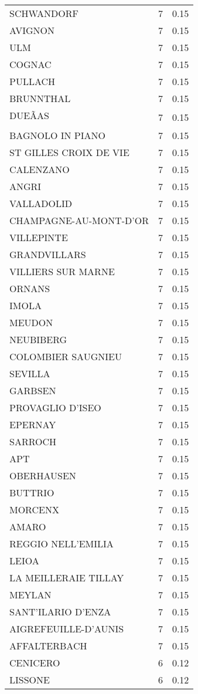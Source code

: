 \begin{table*}[htbp]
\begin{tabular}{lrr}
SCHWANDORF & 7 & 0.15 \\
AVIGNON & 7 & 0.15 \\
ULM & 7 & 0.15 \\
COGNAC & 7 & 0.15 \\
PULLACH & 7 & 0.15 \\
BRUNNTHAL & 7 & 0.15 \\
DUEÃAS & 7 & 0.15 \\
BAGNOLO IN PIANO & 7 & 0.15 \\
ST GILLES CROIX DE VIE & 7 & 0.15 \\
CALENZANO & 7 & 0.15 \\
ANGRI & 7 & 0.15 \\
VALLADOLID & 7 & 0.15 \\
CHAMPAGNE-AU-MONT-D'OR & 7 & 0.15 \\
VILLEPINTE & 7 & 0.15 \\
GRANDVILLARS & 7 & 0.15 \\
VILLIERS SUR MARNE & 7 & 0.15 \\
ORNANS & 7 & 0.15 \\
IMOLA & 7 & 0.15 \\
MEUDON & 7 & 0.15 \\
NEUBIBERG & 7 & 0.15 \\
COLOMBIER SAUGNIEU & 7 & 0.15 \\
SEVILLA & 7 & 0.15 \\
GARBSEN & 7 & 0.15 \\
PROVAGLIO D'ISEO & 7 & 0.15 \\
EPERNAY & 7 & 0.15 \\
SARROCH & 7 & 0.15 \\
APT & 7 & 0.15 \\
OBERHAUSEN & 7 & 0.15 \\
BUTTRIO & 7 & 0.15 \\
MORCENX & 7 & 0.15 \\
AMARO & 7 & 0.15 \\
REGGIO NELL'EMILIA & 7 & 0.15 \\
LEIOA & 7 & 0.15 \\
LA MEILLERAIE TILLAY & 7 & 0.15 \\
MEYLAN & 7 & 0.15 \\
SANT'ILARIO D'ENZA & 7 & 0.15 \\
AIGREFEUILLE-D'AUNIS & 7 & 0.15 \\
AFFALTERBACH & 7 & 0.15 \\
CENICERO & 6 & 0.12 \\
LISSONE & 6 & 0.12 \\

\end{tabular}
\end{table*}
